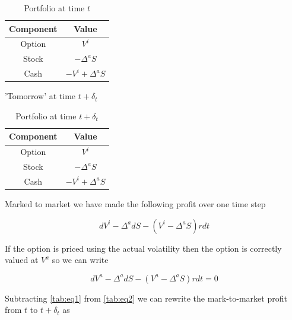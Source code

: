 \documentclass{article}
\newcommand{\para}{\vspace{8pt}} %
\begin{document}
\begin{table}[H]
    \centering
    \begin{tabular}{|c|c|}
        \hline
        \textbf{Component} & \textbf{Value} \\
        \hline
        Option & $V^{i}$ \\
        \hline
        Stock & $-\Delta^{a}S$ \\
        \hline
        Cash & $-V^{i} + \Delta^{a}S$ \\
        \hline
    \end{tabular}
    \caption{Portfolio at time $t$}
    \label{tab:portfolio_t}
\end{table}

\para
'Tomorrow' at time $t + \delta_t$
\begin{table}[H]
    \centering
    \begin{tabular}{|c|c|}
        \hline
        \textbf{Component} & \textbf{Value} \\
        \hline
        Option & $V^{i}$ \\
        \hline
        Stock & $-\Delta^{a}S$ \\
        \hline
        Cash & $-V^{i} + \Delta^{a}S$ \\
        \hline
    \end{tabular}
    \caption{Portfolio at time $t + \delta_{t}$}
    \label{tab:portfolio_t_plus_delta_t}
\end{table}

Marked to market we have made the following profit over one time step

\begin{center}
\begin{equation}
    dV^i - \Delta^a dS -(V^i - \Delta^a S) rdt
    \label{tab:eq1}
\end{equation}
\end{center}


If the option is priced using the actual volatility then the option is correctly valued at $V^a$ so we can write

\begin{center}
\begin{equation}
    dV^a - \Delta^a dS -(V^a - \Delta^a S) rdt = 0 
    \label{tab:eq2}
\end{equation}
\end{center}

Subtracting \ref{tab:eq1} from \ref{tab:eq2} we can rewrite the mark-to-market profit from $t$ to $t + \delta_t$ as
\end{document}
